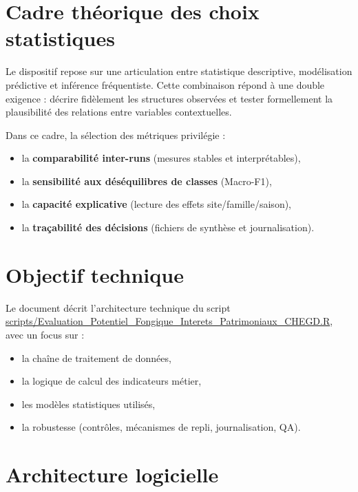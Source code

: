 \documentclass[11pt,a4paper]{article}
\begin{document}
\section{Cadre th\'eorique des choix statistiques}
Le dispositif repose sur une articulation entre statistique descriptive,
mod\'elisation pr\'edictive et inf\'erence fr\'equentiste. Cette combinaison r\'epond
à une double exigence : d\'ecrire fidèlement les structures observ\'ees et tester
formellement la plausibilit\'e des relations entre variables contextuelles.

Dans ce cadre, la s\'election des m\'etriques privil\'egie :
\begin{itemize}[leftmargin=1.2cm]
  \item la \textbf{comparabilit\'e inter-runs} (mesures stables et interpr\'etables),
  \item la \textbf{sensibilit\'e aux d\'es\'equilibres de classes} (Macro-F1),
  \item la \textbf{capacit\'e explicative} (lecture des effets site/famille/saison),
  \item la \textbf{traçabilit\'e des d\'ecisions} (fichiers de synthèse et journalisation).
\end{itemize}

\section{Objectif technique}
Le document d\'ecrit l'architecture technique du script
\url{scripts/Evaluation_Potentiel_Fongique_Interets_Patrimoniaux_CHEGD.R},
avec un focus sur :
\begin{itemize}[leftmargin=1.2cm]
  \item la chaîne de traitement de donn\'ees,
  \item la logique de calcul des indicateurs m\'etier,
  \item les modèles statistiques utilis\'es,
  \item la robustesse (contrôles, m\'ecanismes de repli, journalisation, QA).
\end{itemize}

\section{Architecture logicielle}
\end{document}
